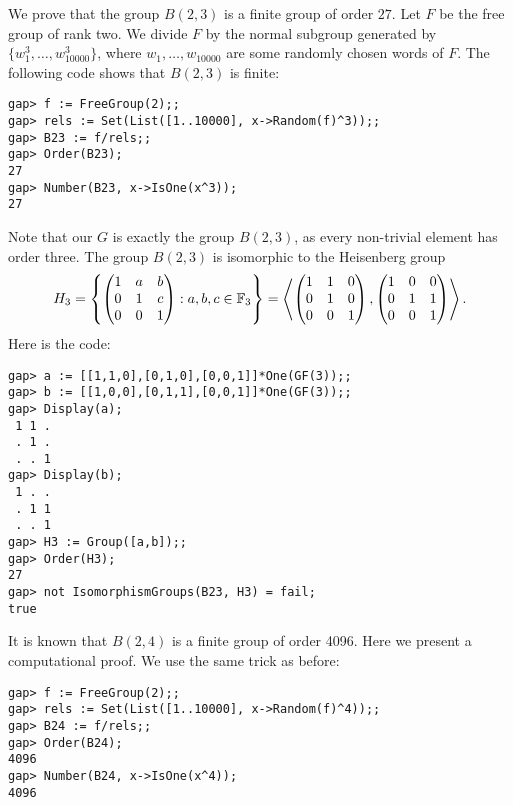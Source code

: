 \begin{example}
	We prove that the group $B(2,3)$ is a finite group of order $27$.
	Let $F$ be the free group of rank two. We divide $F$ by the
	normal subgroup generated by $\{w_1^3,\dots,w_{10000}^3\}$, where 
	$w_1,\dots,w_{10000}$ are some randomly chosen words of $F$.
	The following
	code shows that $B(2,3)$ is finite:
\begin{lstlisting}
gap> f := FreeGroup(2);;
gap> rels := Set(List([1..10000], x->Random(f)^3));;
gap> B23 := f/rels;;
gap> Order(B23);
27
gap> Number(B23, x->IsOne(x^3));
27
\end{lstlisting}
Note that our $G$ is exactly the group $B(2,3)$, as every non-trivial
element has order three. The group $B(2,3)$ is isomorphic
to the Heisenberg group
\[
H_3=\left\{\begin{pmatrix}
    1 & a & b\\
    0 & 1 & c\\
    0 & 0 & 1
    \end{pmatrix}:a,b,c\in\mathbb{F}_3\right\}
    =\left\langle 
    \begin{pmatrix}
    1 & 1 & 0\\
    0 & 1 & 0\\
    0 & 0 & 1
    \end{pmatrix},
    \begin{pmatrix}
    1 & 0 & 0\\
    0 & 1 & 1\\
    0 & 0 & 1
    \end{pmatrix}
    \right\rangle.
\]
Here is the code:
\begin{lstlisting}
gap> a := [[1,1,0],[0,1,0],[0,0,1]]*One(GF(3));;
gap> b := [[1,0,0],[0,1,1],[0,0,1]]*One(GF(3));;
gap> Display(a);
 1 1 .
 . 1 .
 . . 1
gap> Display(b);
 1 . .
 . 1 1
 . . 1
gap> H3 := Group([a,b]);;
gap> Order(H3);
27
gap> not IsomorphismGroups(B23, H3) = fail;
true
\end{lstlisting}
\end{example}

\begin{example}
	It is known that $B(2,4)$ is a finite group of order 4096. 
	Here we present a
	computational proof.  We use the same trick as before:
\begin{lstlisting}
gap> f := FreeGroup(2);;
gap> rels := Set(List([1..10000], x->Random(f)^4));;
gap> B24 := f/rels;;
gap> Order(B24);
4096
gap> Number(B24, x->IsOne(x^4));
4096
\end{lstlisting}
\end{example}



